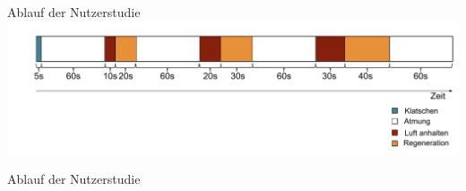 \documentclass[18pt]{beamer}
\begin{document}
\begin{frame}{Ablauf der Nutzerstudie}
    \includegraphics[scale=0.45]{images/study/study_flow2.pdf}
\end{frame}

\begin{frame}{Ablauf der Nutzerstudie}
    \begin{center}
        \begin{columns}[T] %
            \begin{column}{.33\textwidth}
                \centering

\end{column}
\end{columns}
\end{center}
\end{frame}
\end{document}
